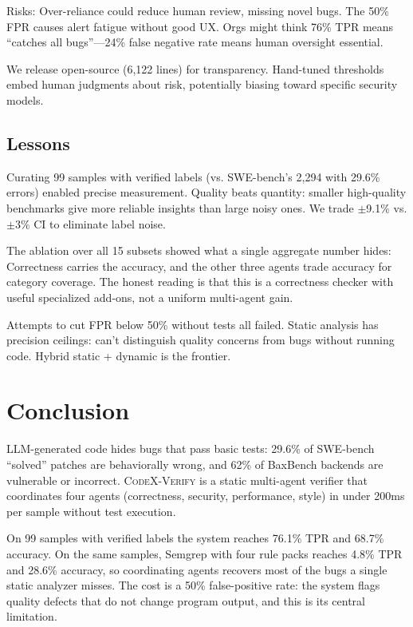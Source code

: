 \documentclass[10pt,twocolumn]{article}
\begin{document}
Risks: Over-reliance could reduce human review, missing novel bugs. The 50\% FPR causes alert fatigue without good UX. Orgs might think 76\% TPR means ``catches all bugs''---24\% false negative rate means human oversight essential.

We release open-source (6,122 lines) for transparency. Hand-tuned thresholds embed human judgments about risk, potentially biasing toward specific security models.

\subsection{Lessons}

Curating 99 samples with verified labels (vs. SWE-bench's 2,294 with 29.6\% errors) enabled precise measurement. Quality beats quantity: smaller high-quality benchmarks give more reliable insights than large noisy ones. We trade $\pm$9.1\% vs. $\pm$3\% CI to eliminate label noise.

The ablation over all 15 subsets showed what a single aggregate number hides: Correctness carries the accuracy, and the other three agents trade accuracy for category coverage. The honest reading is that this is a correctness checker with useful specialized add-ons, not a uniform multi-agent gain.

Attempts to cut FPR below 50\% without tests all failed. Static analysis has precision ceilings: can't distinguish quality concerns from bugs without running code. Hybrid static + dynamic is the frontier.


\section{Conclusion}

LLM-generated code hides bugs that pass basic tests: 29.6\% of SWE-bench ``solved'' patches are behaviorally wrong, and 62\% of BaxBench backends are vulnerable or incorrect. \textsc{CodeX-Verify} is a static multi-agent verifier that coordinates four agents (correctness, security, performance, style) in under 200ms per sample without test execution.

On 99 samples with verified labels the system reaches 76.1\% TPR and 68.7\% accuracy. On the same samples, Semgrep with four rule packs reaches 4.8\% TPR and 28.6\% accuracy, so coordinating agents recovers most of the bugs a single static analyzer misses. The cost is a 50\% false-positive rate: the system flags quality defects that do not change program output, and this is its central limitation.
\end{document}
